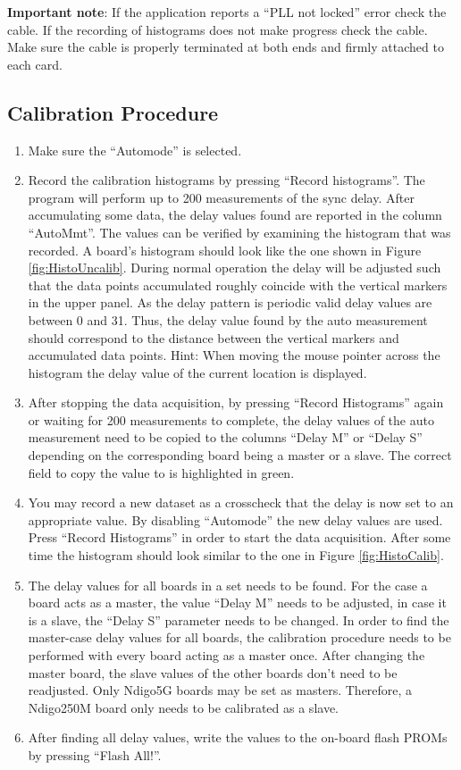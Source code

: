 \textbf{Important note}: If the application reports a ``PLL not locked'' error check the cable. If the recording of histograms does not make progress check the cable. Make sure the cable is properly terminated at both ends and firmly attached to each card.

    \subsection{Calibration Procedure}

        \begin{enumerate}
            \item Make sure the ``Automode'' is selected.
            \item Record the calibration histograms by pressing ``Record histograms''. The program will perform up to 200 measurements of the sync delay. After accumulating some data, the delay values found are reported in the column ``AutoMmt''. The values can be verified by examining the histogram that was recorded. A board's histogram should look like the one shown in Figure \ref{fig:HistoUncalib}. During normal operation the delay will be adjusted such that the data points accumulated roughly coincide with the vertical markers in the upper panel. As the delay pattern is periodic valid delay values are between 0 and 31. Thus, the delay value found by the auto measurement should correspond to the distance between the vertical markers and accumulated data points. Hint: When moving the mouse pointer across the histogram the delay value of the current location is displayed.
            \item After stopping the data acquisition, by pressing ``Record Histograms'' again or waiting for 200 measurements to complete, the delay values of the auto measurement need to be copied to the columns ``Delay M'' or ``Delay S'' depending on the corresponding board being a master or a slave. The correct field to copy the value to is highlighted in green.
            \item You may record a new dataset as a crosscheck that the delay is now set to an appropriate value. By disabling ``Automode'' the new delay values are used. Press ``Record Histograms'' in order to start the data acquisition. After some time the histogram should look similar to the one in Figure \ref{fig:HistoCalib}.
            \item The delay values for all boards in a set needs to be found. For the case a board acts as a master, the value ``Delay M'' needs to be adjusted, in case it is a slave, the ``Delay S'' parameter needs to be changed. In order to find the master-case delay values for all boards, the calibration procedure needs to be performed with every board acting as a master once. After changing the master board, the slave values of the other boards don't need to be readjusted. Only Ndigo5G boards may be set as masters. Therefore, a Ndigo250M board only needs to be calibrated as a slave.
            \item After finding all delay values, write the values to the on-board flash PROMs by pressing ``Flash All!''.
        \end{enumerate}

